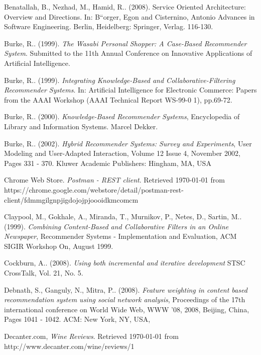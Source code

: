 \small
\raggedright
\begin{thebibliography}{9}

     Benatallah, B., Nezhad, M., Hamid, R.. (2008). Service Oriented Architecture: Overview and Directions. In: B``{o}rger, Egon and Cisternino, Antonio Advances in Software Engineering. Berlin, Heidelberg: Springer, Verlag. 116-130.

     Burke, R.. (1999). \emph{The Wasabi Personal Shopper: A Case-Based Recommender System}. Submitted to the 11th Annual Conference on Innovative Applications of Artificial Intelligence.

     Burke, R.. (1999). \emph{Integrating Knowledge-Based and Collaborative-Filtering Recommender Systems}. In: Artificial Intelligence for Electronic Commerce: Papers from the AAAI Workshop (AAAI Technical Report WS-99-0 1), pp.69-72.

     Burke, R.. (2000). \emph{Knowledge-Based Recommender Systems}, Encyclopedia of Library and Information Systems. Marcel Dekker.

     Burke, R.. (2002). \emph{Hybrid Recommender Systems: Survey and Experiments}, User Modeling and User-Adapted Interaction, Volume 12 Issue 4, November 2002, Pages 331 - 370. Kluwer Academic Publishers: Hingham, MA, USA

     Chrome Web Store. \emph{Postman - REST client}. Retrieved \today{} from https://chrome.google.com/webstore/detail/postman-rest-client/fdmmgilgnpjigdojojpjoooidkmcomcm

     Claypool, M., Gokhale, A., Miranda, T., Murnikov, P., Netes, D., Sartin, M.. (1999). \emph{Combining Content-Based and Collaborative Filters in an Online Newspaper}, Recommender Systems - Implementation and Evaluation, ACM SIGIR Workshop On, August 1999.

     Cockburn, A.. (2008). \emph{Using both incremental and iterative development} STSC CrossTalk, Vol. 21, No. 5.

     Debnath, S., Ganguly, N., Mitra, P.. (2008). \emph{Feature weighting in content based recommendation system using social network analysis}, Proceedings of the 17th international conference on World Wide Web, WWW '08, 2008, Beijing, China, Pages 1041 - 1042. ACM: New York, NY, USA,

     Decanter.com, \emph{Wine Reviews}. Retrieved \today{} from http://www.decanter.com/wine/reviews/1


\end{thebibliography}
